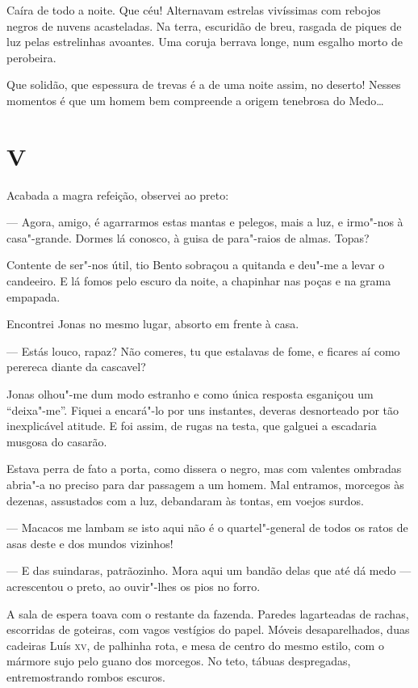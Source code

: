 Caíra de todo a noite. Que céu! Alternavam estrelas vivíssimas com
rebojos negros de nuvens acasteladas. Na terra, escuridão de breu,
rasgada de piques de luz pelas estrelinhas avoantes. Uma coruja berrava
longe, num esgalho morto de perobeira.

Que solidão, que espessura de trevas é a de uma noite assim, no deserto!
Nesses momentos é que um homem bem compreende a origem tenebrosa do
Medo\ldots{}

\section*{V}

Acabada a magra refeição, observei ao preto:

--- Agora, amigo, é agarrarmos estas mantas e pelegos, mais a luz, e
irmo"-nos à casa"-grande. Dormes lá conosco, à guisa de para"-raios de
almas. Topas?

Contente de ser"-nos útil, tio Bento sobraçou a quitanda e deu"-me a levar
o candeeiro. E lá fomos pelo escuro da noite, a chapinhar nas poças e na
grama empapada.

Encontrei Jonas no mesmo lugar, absorto em frente à casa.

--- Estás louco, rapaz? Não comeres, tu que estalavas de fome, e ficares
aí como perereca diante da cascavel?

Jonas olhou"-me dum modo estranho e como única resposta esganiçou um
``deixa"-me''. Fiquei a encará"-lo por uns instantes, deveras desnorteado
por tão inexplicável atitude. E foi assim, de rugas na testa, que
galguei a escadaria musgosa do casarão.

Estava perra de fato a porta, como dissera o negro, mas com valentes
ombradas abria"-a no preciso para dar passagem a um homem. Mal entramos,
morcegos às dezenas, assustados com a luz, debandaram às tontas, em
voejos surdos.

--- Macacos me lambam se isto aqui não é o quartel"-general de todos os
ratos de asas deste e dos mundos vizinhos!

--- E das suindaras, patrãozinho. Mora aqui um bandão delas que até dá
medo --- acrescentou o preto, ao ouvir"-lhes os pios no forro.

A sala de espera toava com o restante da fazenda. Paredes lagarteadas de
rachas, escorridas de goteiras, com vagos vestígios do papel. Móveis
desaparelhados, duas cadeiras Luís \textsc{xv}, de palhinha rota, e mesa de
centro do mesmo estilo, com o mármore sujo pelo guano dos morcegos. No
teto, tábuas despregadas, entremostrando rombos escuros.

